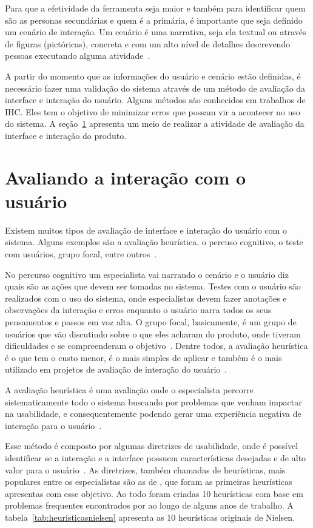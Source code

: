 Para que a efetividade da ferramenta seja maior e também para identificar quem são as personas secundárias e quem é a primária, é importante que seja definido um cenário de interação. Um cenário é uma narrativa, seja ela textual ou através de figuras (pictóricas), concreta e com um alto nível de detalhes descrevendo pessoas executando alguma atividade~\cite{barbosa:2010}.

A partir do momento que as informações do usuário e cenário estão definidas, é necessário fazer uma validação do sistema através de um método de avaliação da interface e interação do usuário. Alguns métodos são conhecidos em trabalhos de IHC. Eles tem o objetivo de minimizar erros que possam vir a acontecer no uso do sistema. A seção~\ref{sec:avaliacao} apresenta um meio de realizar a atividade de avaliação da interface e interação do produto.

\section{Avaliando a interação com o usuário}
\label{sec:avaliacao}
Existem muitos tipos de avaliação de interface e interação do usuário com o sistema. Alguns exemplos são a avaliação heurística, o percuso cognitivo, o teste com usuários, grupo focal, entre outros~\cite{barbosa:2010}.

No percurso cognitivo um especialista vai narrando o cenário e o usuário diz quais são as ações que devem ser tomadas no sistema. Testes com o usuário são realizados com o uso do sistema, onde especialistas devem fazer anotações e observações da interação e erros enquanto o usuário narra todos os seus pensamentos e passos em voz alta. O grupo focal, basicamente, é um grupo de usuários que vão discutindo sobre o que eles acharam do produto, onde tiveram dificuldades e se compreenderam o objetivo~\cite{barbosa:2010}. Dentre todos, a avaliação heurística é o que tem o custo menor, é o mais simples de aplicar e também é o mais utilizado em projetos de avaliação de interação do usuário~\cite{tsui:2010}.

A avaliação heurística é uma avaliação onde o especialista percorre sistematicamente todo o sistema buscando por problemas que venham impactar na usabilidade, e consequentemente podendo gerar uma experiência negativa de interação para o usuário~\cite{barbosa:2010, benyon:2011}.

Esse método é composto por algumas diretrizes de usabilidade, onde é possível identificar se a interação e a interface possuem características desejadas e de alto valor para o usuário~\cite{barbosa:2010, benyon:2011}. As diretrizes, também chamadas de heurísticas, mais populares entre os especialistas são as de , que foram as primeiras heurísticas apresentas com esse objetivo. Ao todo foram criadas 10 heurísticas com base em problemas frequentes encontrados por  ao longo de alguns anos de trabalho. A tabela~\ref{tab:heuristicasnielsen} apresenta as 10 heurísticas originais de Nielsen.

